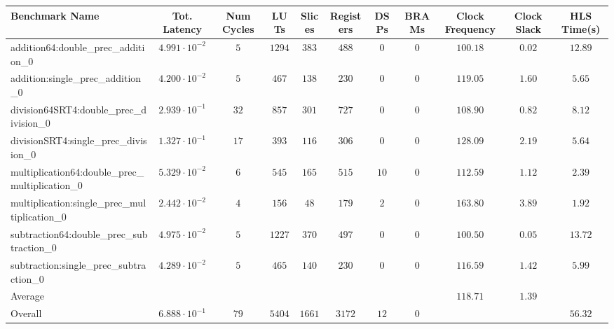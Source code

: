 \begin{tabular}{|l|c|c|c|c|c|c|c|c|c|c|}
\hline
Benchmark Name                                   & Tot. Latency            & Num Cycles & LUTs     & Slices   & Registers & DSPs   & BRAMs & Clock Frequency & Clock Slack & HLS Time(s) \\
\hline
addition64:double\_prec\_addition\_0             & $ 4.991 \cdot 10^{-2} $ & $ 5      $ & $ 1294 $ & $ 383  $ & $ 488   $ & $ 0  $ & $ 0 $ & $ 100.18      $ & $ 0.02    $ & $ 12.89   $ \\
addition:single\_prec\_addition\_0               & $ 4.200 \cdot 10^{-2} $ & $ 5      $ & $ 467  $ & $ 138  $ & $ 230   $ & $ 0  $ & $ 0 $ & $ 119.05      $ & $ 1.60    $ & $ 5.65    $ \\
division64SRT4:double\_prec\_division\_0         & $ 2.939 \cdot 10^{-1} $ & $ 32     $ & $ 857  $ & $ 301  $ & $ 727   $ & $ 0  $ & $ 0 $ & $ 108.90      $ & $ 0.82    $ & $ 8.12    $ \\
divisionSRT4:single\_prec\_division\_0           & $ 1.327 \cdot 10^{-1} $ & $ 17     $ & $ 393  $ & $ 116  $ & $ 306   $ & $ 0  $ & $ 0 $ & $ 128.09      $ & $ 2.19    $ & $ 5.64    $ \\
multiplication64:double\_prec\_multiplication\_0 & $ 5.329 \cdot 10^{-2} $ & $ 6      $ & $ 545  $ & $ 165  $ & $ 515   $ & $ 10 $ & $ 0 $ & $ 112.59      $ & $ 1.12    $ & $ 2.39    $ \\
multiplication:single\_prec\_multiplication\_0   & $ 2.442 \cdot 10^{-2} $ & $ 4      $ & $ 156  $ & $ 48   $ & $ 179   $ & $ 2  $ & $ 0 $ & $ 163.80      $ & $ 3.89    $ & $ 1.92    $ \\
subtraction64:double\_prec\_subtraction\_0       & $ 4.975 \cdot 10^{-2} $ & $ 5      $ & $ 1227 $ & $ 370  $ & $ 497   $ & $ 0  $ & $ 0 $ & $ 100.50      $ & $ 0.05    $ & $ 13.72   $ \\
subtraction:single\_prec\_subtraction\_0         & $ 4.289 \cdot 10^{-2} $ & $ 5      $ & $ 465  $ & $ 140  $ & $ 230   $ & $ 0  $ & $ 0 $ & $ 116.59      $ & $ 1.42    $ & $ 5.99    $ \\
\hline
Average                                          & $                     $ & $        $ & $      $ & $      $ & $       $ & $    $ & $   $ & $ 118.71      $ & $ 1.39    $ & $         $ \\
\hline
Overall                                          & $ 6.888 \cdot 10^{-1} $ & $ 79     $ & $ 5404 $ & $ 1661 $ & $ 3172  $ & $ 12 $ & $ 0 $ & $             $ & $         $ & $ 56.32   $ \\
\hline
\end{tabular}
